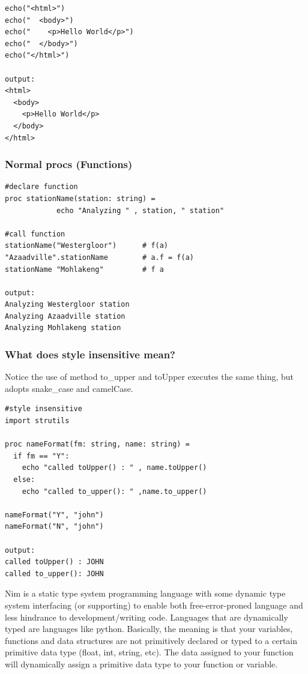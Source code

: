 \documentclass[10pt, a4paper, twocolumn]{article} %
\begin{document}
\begin{lstlisting}
echo("<html>")
echo("  <body>")
echo("    <p>Hello World</p>")
echo("  </body>")
echo("</html>")

output:
<html>
  <body>
    <p>Hello World</p>
  </body>
</html>
\end{lstlisting}


\subsubsection{Normal procs (Functions)}

\begin{lstlisting}
#declare function
proc stationName(station: string) =
			echo "Analyzing " , station, " station"

#call function
stationName("Westergloor")      # f(a)
"Azaadville".stationName        # a.f = f(a)
stationName "Mohlakeng"         # f a

output:
Analyzing Westergloor station
Analyzing Azaadville station
Analyzing Mohlakeng station
\end{lstlisting}

\subsubsection{What does style insensitive mean?}

Notice the use of method to\_upper\(\) and toUpper\(\) executes
the same thing, but adopts snake\_case and camelCase.

\begin{lstlisting}
#style insensitive
import strutils

proc nameFormat(fm: string, name: string) =
  if fm == "Y":
    echo "called toUpper() : " , name.toUpper()
  else:
    echo "called to_upper(): " ,name.to_upper()

nameFormat("Y", "john")
nameFormat("N", "john")

output:
called toUpper() : JOHN
called to_upper(): JOHN
\end{lstlisting}


Nim is a static type system programming language with some dynamic type system interfacing (or supporting) to enable both free-error-proned language and less hindrance to development/writing code. Languages that are dynamically typed are languages like python. Basically, the meaning is that your variables, functions and data structures are not primitively declared or typed to a certain primitive data type (float, int, string, etc). The data assigned to your function will dynamically assign a primitive data type to your function or variable.
\end{document}
